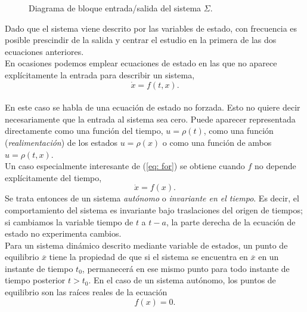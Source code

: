 \begin{figure}[!ht]
\centering
{}
	\caption{Diagrama de bloque entrada/salida del sistema $\Sigma$.}
	\label{fig: sigma}
\end{figure}

Dado que el sistema viene descrito por las variables de estado,  con frecuencia es posible prescindir de la salida y centrar el estudio en la primera de las dos ecuaciones anteriores.\\

 En ocasiones podemos emplear ecuaciones de estado en las que no aparece explícitamente la entrada  para describir un sistema,
\begin{equation}
\dot x = f(t,x).
\end{equation}\label{eq: for}\\

En este caso se habla de una ecuación de estado no forzada. Esto no quiere decir necesariamente que la entrada al sistema sea cero. Puede aparecer representada directamente como una función del tiempo, $u=\rho(t)$,  como una función (\emph{realimentación}) de los estados $u = \rho(x)$ o como una función de ambos $u=\rho(t,x)$.\\

Un caso especialmente interesante de (\ref{eq: for}) se obtiene cuando $f$ no depende explícitamente del tiempo,
\begin{equation}
\dot x = f(x).
\end{equation}
Se trata entonces de un sistema \emph{autónomo} o \emph{invariante en el tiempo}. Es decir, el comportamiento del sistema es invariante bajo traslaciones del origen de tiempos; si cambiamos la variable tiempo de $t$ a $t-a$, la parte derecha de la ecuación de estado no experimenta cambios.\\

Para un sistema dinámico descrito mediante variable de estados, un punto de equilibrio $\overline x$  tiene la propiedad de que si el sistema se encuentra en $\overline x$ en un instante de tiempo $t_0$, permanecerá en ese mismo punto para todo instante de tiempo posterior $t>t_0$. En el caso de un sistema autónomo, los puntos de equilibrio son las raíces reales de la ecuación
\begin{equation}
f(x)=0.
\end{equation} \\

